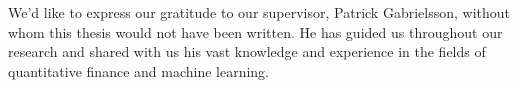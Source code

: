 \begin{center}
  \textbf{}

  \vspace{3mm}

  \parbox{0.8\textwidth}{
    We'd like to express our gratitude to our supervisor, Patrick Gabrielsson,
    without whom this thesis would not have been written.  He has guided us
    throughout our research and shared with us his vast knowledge and
    experience in the fields of quantitative finance and machine learning.
  }
\end{center}
